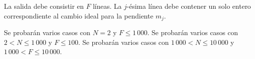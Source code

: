 \documentclass{oci}
\begin{document}
\begin{outputDescription}
La salida debe consistir en $F$ líneas.
La $j$-ésima línea debe contener un solo entero correspondiente al cambio ideal
para la pendiente $m_j$.
\end{outputDescription}

\begin{scoreDescription}
   Se probarán varios casos con $N=2$ y $F\leq 1\,000$.
   Se probarán varios casos con $2 < N \leq 1\,000$ y $F\leq 100$.
   Se probarán varios casos con $1\,000< N \leq 10\,000$ y $1\,000 <
  F\leq 10\,000$.
\end{scoreDescription}

\begin{sampleDescription}
\end{sampleDescription}
\end{document}
